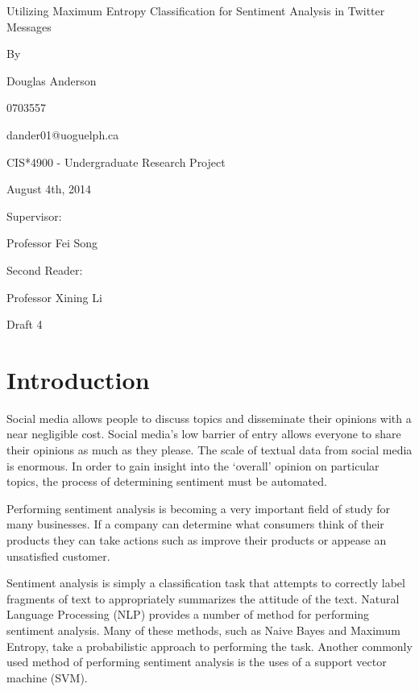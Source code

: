\documentclass[final,3p,12pt]{elsarticle}
\begin{document}
\thispagestyle{empty}
\begin{center}

\huge

Utilizing Maximum Entropy Classification for Sentiment Analysis in Twitter Messages

\large
\vspace{2.0cm}
By

\vspace{1.0cm}
Douglas Anderson

0703557

dander01@uoguelph.ca

\vspace{1.5cm}
CIS*4900 - Undergraduate Research Project

August 4th, 2014 %

\vspace{1.5cm}

Supervisor:

Professor Fei Song

\vspace{1.5cm}

Second Reader:

Professor Xining Li

\vspace{1.5cm}

Draft 4 %

\end{center}

\newpage
\setcounter{page}{1}

\section{Introduction}
\label{section:intro}

Social media allows people to discuss topics and disseminate their opinions
with a near negligible cost. Social media's low barrier of entry allows
everyone to share their opinions as much as they please. The scale of textual
data from social media is enormous. In order to gain insight into the `overall'
opinion on particular topics, the process of determining sentiment must be
automated.

Performing sentiment analysis is becoming a very important field of study for
many businesses. If a company can determine what consumers think of their
products they can take actions such as improve their products or appease an
unsatisfied customer.

Sentiment analysis is simply a classification task that attempts to correctly
label fragments of text to appropriately summarizes the attitude of the text.
Natural Language Processing (NLP) provides a number of method for performing
sentiment analysis. Many of these methods, such as Naive Bayes and Maximum
Entropy, take a probabilistic approach to performing the task. Another commonly
used method of performing sentiment analysis is the uses of a support vector
machine (SVM).
\end{document}
